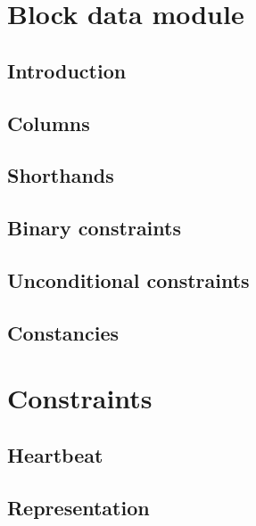 

\section{Block data module}
\subsection{Introduction}                                   \label{block data: intro}                 
\subsection{Columns}                                        \label{block data: columns}               
\subsection{Shorthands}                                     \label{block data: shorthands}            
\subsection{Binary constraints}                             \label{block data: binarities}            
\subsection{Unconditional constraints}                      \label{block data: unconditional}         
\subsection{Constancies}                                    \label{block data: constancies}           

\section{Constraints}
\subsection{Heartbeat}                                      \label{block data: heartbeat}             
\subsection{Representation}                                 \label{block data: representation}        
